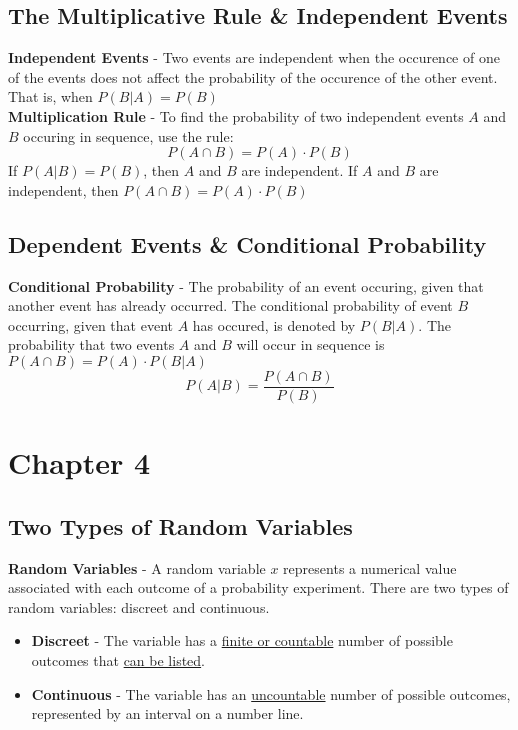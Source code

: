 \documentclass[a4paper]{article}
\let\bf\textbf
\begin{document}
\subsection{The Multiplicative Rule \& Independent Events}
\bf{Independent Events} - Two events are independent when the occurence of one of the events does not affect the probability of the occurence of the other event. That is, when $P(B|A) = P(B)$
\vspace{2mm}\\
\noindent\bf{Multiplication Rule} - To find the probability of two independent events $A$ and $B$ occuring in sequence, use the rule:
\begin{equation}
    P(A \cap B) = P(A) \cdot P(B)
\end{equation}
\noindent If $P(A | B) = P(B)$, then  $A$ and $B$ are independent. If $A$ and $B$ are independent, then $P(A \cap B) = P(A) \cdot P(B)$
\subsection{Dependent Events \& Conditional Probability}
\bf{Conditional Probability} - The probability of an event occuring, given that another event has already occurred. The conditional probability of event $B$ occurring, given that event $A$ has occured, is denoted by $P(B|A)$. The probability that two events $A$ and $B$ will occur in sequence is $P(A \cap B) = P(A) \cdot P(B|A)$
\begin{equation}
    P(A|B) = \frac{P(A \cap B)}{P(B)}
\end{equation}

\section{Chapter 4}
\subsection{Two Types of Random Variables}
\bf{Random Variables} - A random variable $x$ represents a numerical value associated with each outcome of a probability experiment. There are two types of random variables: discreet and continuous.
\begin{itemize}
    \item \bf{Discreet} - The variable has a \underline{finite or countable} number of possible outcomes that \underline{can be listed}.
    \item \bf{Continuous} - The variable has an \underline{uncountable} number of possible outcomes, represented by an interval on a number line.
\end{itemize}
\end{document}

